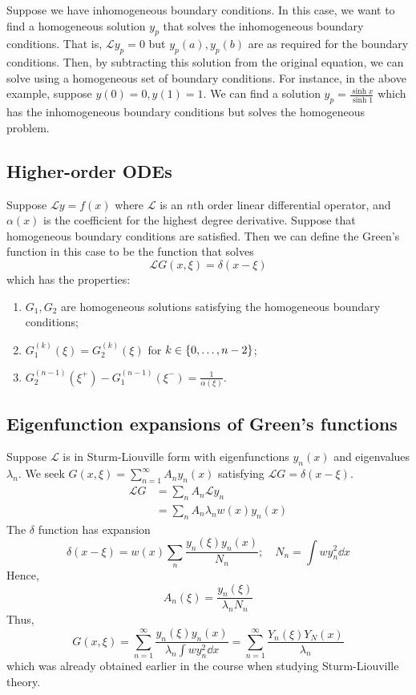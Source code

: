 Suppose we have inhomogeneous boundary conditions.
In this case, we want to find a homogeneous solution \( y_p \) that solves the inhomogeneous boundary conditions.
That is, \( \mathcal L y_p = 0 \) but \( y_p(a), y_p(b) \) are as required for the boundary conditions.
Then, by subtracting this solution from the original equation, we can solve using a homogeneous set of boundary conditions.
For instance, in the above example, suppose \( y(0) = 0, y(1) = 1 \).
We can find a solution \( y_p = \frac{\sinh x}{\sinh 1} \) which has the inhomogeneous boundary conditions but solves the homogeneous problem.

\subsection{Higher-order ODEs}
Suppose \( \mathcal L y = f(x) \) where \( \mathcal L \) is an \( n \)th order linear differential operator, and \( \alpha(x) \) is the coefficient for the highest degree derivative.
Suppose that homogeneous boundary conditions are satisfied.
Then we can define the Green's function in this case to be the function that solves
\[
	\mathcal L G(x,\xi) = \delta(x-\xi)
\]
which has the properties:
\begin{enumerate}
	\item \( G_1, G_2 \) are homogeneous solutions satisfying the homogeneous boundary conditions;
	\item \( G_1^{(k)}(\xi) = G_2^{(k)}(\xi) \) for \( k \in \qty{0, \dots, n-2} \);
	\item \( G_2^{(n-1)}(\xi^+) - G_1^{(n-1)}(\xi^-) = \frac{1}{\alpha(\xi)} \).
\end{enumerate}

\subsection{Eigenfunction expansions of Green's functions}
Suppose \( \mathcal L \) is in Sturm-Liouville form with eigenfunctions \( y_n(x) \) and eigenvalues \( \lambda_n \).
We seek \( G(x,\xi) = \sum_{n=1}^\infty A_n y_n(x) \) satisfying \( \mathcal L G = \delta(x-\xi) \).
\begin{align*}
	\mathcal L G & = \sum_n A_n \mathcal L y_n        \\
	             & = \sum_n A_n \lambda_n w(x) y_n(x)
\end{align*}
The \( \delta \) function has expansion
\[
	\delta(x-\xi) = w(x) \sum_n \frac{y_n(\xi) y_n(x)}{N_n};\quad N_n = \int w y_n^2 \dd{x}
\]
Hence,
\[
	A_n(\xi) = \frac{y_n(\xi)}{\lambda_n N_n}
\]
Thus,
\[
	G(x,\xi) = \sum_{n=1}^\infty \frac{y_n(\xi) y_n(x)}{\lambda_n \int w y_n^2 \dd{x}} = \sum_{n=1}^\infty \frac{Y_n(\xi) Y_N(x)}{\lambda_n}
\]
which was already obtained earlier in the course when studying Sturm-Liouville theory.

